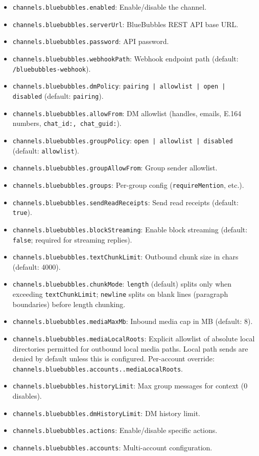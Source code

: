 \begin{itemize}
  \item \texttt{channels.bluebubbles.enabled}: Enable/disable the channel.
  \item \texttt{channels.bluebubbles.serverUrl}: BlueBubbles REST API base URL.
  \item \texttt{channels.bluebubbles.password}: API password.
  \item \texttt{channels.bluebubbles.webhookPath}: Webhook endpoint path (default: \texttt{/bluebubbles-webhook}).
  \item \texttt{channels.bluebubbles.dmPolicy}: \texttt{pairing | allowlist | open | disabled} (default: \texttt{pairing}).
  \item \texttt{channels.bluebubbles.allowFrom}: DM allowlist (handles, emails, E.164 numbers, \texttt{chat\_id:\textit{}, \texttt{chat\_guid:}}).
  \item \texttt{channels.bluebubbles.groupPolicy}: \texttt{open | allowlist | disabled} (default: \texttt{allowlist}).
  \item \texttt{channels.bluebubbles.groupAllowFrom}: Group sender allowlist.
  \item \texttt{channels.bluebubbles.groups}: Per-group config (\texttt{requireMention}, etc.).
  \item \texttt{channels.bluebubbles.sendReadReceipts}: Send read receipts (default: \texttt{true}).
  \item \texttt{channels.bluebubbles.blockStreaming}: Enable block streaming (default: \texttt{false}; required for streaming replies).
  \item \texttt{channels.bluebubbles.textChunkLimit}: Outbound chunk size in chars (default: 4000).
  \item \texttt{channels.bluebubbles.chunkMode}: \texttt{length} (default) splits only when exceeding \texttt{textChunkLimit}; \texttt{newline} splits on blank lines (paragraph boundaries) before length chunking.
  \item \texttt{channels.bluebubbles.mediaMaxMb}: Inbound media cap in MB (default: 8).
  \item \texttt{channels.bluebubbles.mediaLocalRoots}: Explicit allowlist of absolute local directories permitted for outbound local media paths. Local path sends are denied by default unless this is configured. Per-account override: \texttt{channels.bluebubbles.accounts..mediaLocalRoots}.
  \item \texttt{channels.bluebubbles.historyLimit}: Max group messages for context (0 disables).
  \item \texttt{channels.bluebubbles.dmHistoryLimit}: DM history limit.
  \item \texttt{channels.bluebubbles.actions}: Enable/disable specific actions.
  \item \texttt{channels.bluebubbles.accounts}: Multi-account configuration.
\end{itemize}


